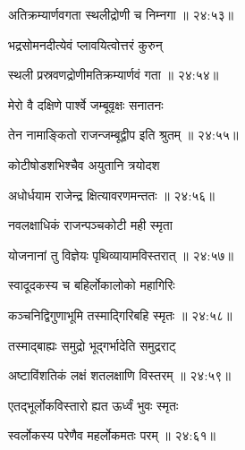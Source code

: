 
{\devanagarifont अतिक्रम्यार्णवगता स्थलीद्रोणी च निम्नगा {॥ २४:५३॥} \veg\dontdisplaylinenum }%
 
{\devanagarifont भद्रसोमनदीत्येवं प्लावयित्वोत्तरं कुरुन् \thinspace{\dandab} \dontdisplaylinenum }%
 

{\devanagarifont स्थली प्रस्रवणद्रोणीमतिक्रम्यार्णवं गता {॥ २४:५४॥} \veg\dontdisplaylinenum }%
 
{\devanagarifont मेरो वै दक्षिणे पार्श्वे जम्बूवृक्षः सनातनः \thinspace{\dandab} \dontdisplaylinenum }%
 

{\devanagarifont तेन नामाङ्कितो राजन्जम्बूद्वीप इति श्रुतम् {॥ २४:५५॥} \veg\dontdisplaylinenum }%
 
{\devanagarifont कोटीषोडशभिश्चैव अयुतानि त्रयोदश \thinspace{\dandab} \dontdisplaylinenum }%
 

{\devanagarifont अधोर्धयाम राजेन्द्र क्षित्यावरणमन्ततः {॥ २४:५६॥} \veg\dontdisplaylinenum }%
 
{\devanagarifont नवलक्षाधिकं राजन्पञ्चकोटी मही स्मृता \thinspace{\dandab} \dontdisplaylinenum }%
 

{\devanagarifont योजनानां तु विज्ञेयः पृथिव्यायामविस्तरात् {॥ २४:५७॥} \veg\dontdisplaylinenum }%
 
{\devanagarifont स्वादूदकस्य च बहिर्लोकालोको महागिरिः \thinspace{\dandab} \dontdisplaylinenum }%
 

{\devanagarifont कञ्चनिद्विगुणाभूमि तस्माद्गिरिबहि स्मृतः {॥ २४:५८॥} \veg\dontdisplaylinenum }%
 
{\devanagarifont तस्माद्बाह्यः समुद्रो भूद्गर्भादेति समुद्रराट् \thinspace{\dandab} \dontdisplaylinenum }%
 

{\devanagarifont अष्टाविंशतिकं लक्षं शतलक्षाणि विस्तरम् {॥ २४:५९॥} \veg\dontdisplaylinenum }%

\vers


{\devanagarifont एतद्भूर्लोकविस्तारो ह्यत ऊर्ध्वं भुवः स्मृतः \thinspace{\dandab} \dontdisplaylinenum }%


{\devanagarifont स्वर्लोकस्य परेणैव महर्लोकमतः परम् {॥ २४:६१॥} \veg\dontdisplaylinenum }%

